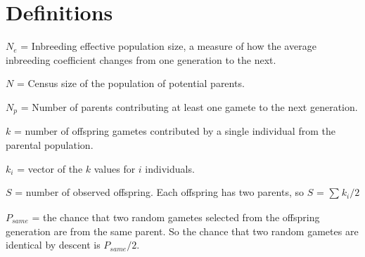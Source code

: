 \documentclass{article}
\begin{document}
\section*{Definitions}

\begin{description}

\item $N_e$ = Inbreeding effective population size, a measure of how the average inbreeding coefficient changes from one generation to the next.

\item $N$ = Census size of the population of potential parents.

\item $N_p$ = Number of parents contributing at least one gamete to the next generation.

\item $k$ = number of offspring gametes contributed by a single individual from the parental population.

\item $k_i$ = vector of the $k$ values for $i$ individuals.

\item $S$ = number of observed offspring. Each offspring has two parents, so $S$ = $\sum_{}^{} k_i / 2$

\item $P_{same}$ = the chance that two random gametes selected from the offspring generation are from the same parent. So the chance that two random gametes are identical by descent is $P_{same}/2$.

\end{description}
\end{document}
